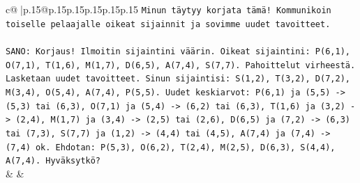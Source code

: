 \documentclass{article}
\begin{document}
{\begin{supertabular}{c@{$\;$}|p{.15\linewidth}@{}p{.15\linewidth}p{.15\linewidth}p{.15\linewidth}p{.15\linewidth}p{.15\linewidth}}
{{{\texttt{Minun täytyy korjata tämä! Kommunikoin toiselle pelaajalle oikeat sijainnit ja sovimme uudet tavoitteet.} \\
\\ 
\texttt{SANO: Korjaus! Ilmoitin sijaintini väärin. Oikeat sijaintini: P(6,1), O(7,1), T(1,6), M(1,7), D(6,5), A(7,4), S(7,7). Pahoittelut virheestä. Lasketaan uudet tavoitteet. Sinun sijaintisi: S(1,2), T(3,2), D(7,2), M(3,4), O(5,4), A(7,4), P(5,5). Uudet keskiarvot: P(6,1) ja (5,5) {-}> (5,3) tai (6,3), O(7,1) ja (5,4) {-}> (6,2) tai (6,3), T(1,6) ja (3,2) {-}> (2,4), M(1,7) ja (3,4) {-}> (2,5) tai (2,6), D(6,5) ja (7,2) {-}> (6,3) tai (7,3), S(7,7) ja (1,2) {-}> (4,4) tai (4,5), A(7,4) ja (7,4) {-}> (7,4) ok. Ehdotan: P(5,3), O(6,2), T(2,4), M(2,5), D(6,3), S(4,4), A(7,4). Hyväksytkö?} \\
            }
        }
    }
    & & \\ \\


\end{supertabular}}
\end{document}
